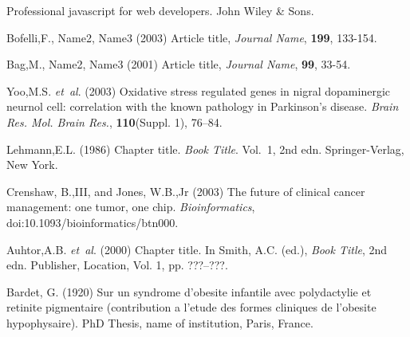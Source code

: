 \documentclass{bioinfo}
\begin{document}
%
%
%
%
%
%
%
%
%


\begin{thebibliography}{}
 Professional javascript for web developers. John Wiley \& Sons.

 Bofelli,F., Name2, Name3 (2003) Article title, {\it Journal Name}, {\bf 199}, 133-154.

 Bag,M., Name2, Name3 (2001) Article title, {\it Journal Name}, {\bf 99}, 33-54.

Yoo,M.S. \textit{et~al}. (2003) Oxidative stress regulated genes
in nigral dopaminergic neurnol cell: correlation with the known
pathology in Parkinson's disease. \textit{Brain Res. Mol. Brain
Res.}, \textbf{110}(Suppl. 1), 76--84.

Lehmann,E.L. (1986) Chapter title. \textit{Book Title}. Vol.~1, 2nd edn. Springer-Verlag, New York.

Crenshaw, B.,III, and Jones, W.B.,Jr (2003) The future of clinical
cancer management: one tumor, one chip. \textit{Bioinformatics},
doi:10.1093/bioinformatics/btn000.

Auhtor,A.B. \textit{et~al}. (2000) Chapter title. In Smith, A.C.
(ed.), \textit{Book Title}, 2nd edn. Publisher, Location, Vol. 1, pp.
???--???.

Bardet, G. (1920) Sur un syndrome d'obesite infantile avec
polydactylie et retinite pigmentaire (contribution a l'etude des
formes cliniques de l'obesite hypophysaire). PhD Thesis, name of
institution, Paris, France.

\end{thebibliography}
\end{document}
